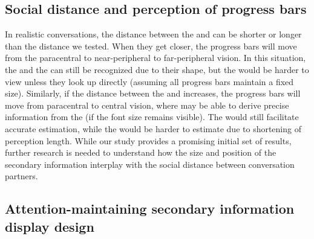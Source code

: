 \subsection{Social distance and perception of progress bars}

In realistic conversations, the distance between the \receiver{} and \observer{} can be shorter or longer than the distance we tested. When they get closer, the progress bars will move from the paracentral to near-peripheral to far-peripheral vision. In this situation, the \circularbar{} and the \linearbar{} can still be recognized due to their shape, but the \textbar{} would be harder to view unless they look up directly (assuming all progress bars maintain a fixed size). Similarly, if the distance between the \receiver{} and \observer{} increases, the progress bars will move from paracentral to central vision, where  may be able to derive precise information from the \textbar{} (if the font size remains visible). The \circularbar{} would still facilitate accurate estimation, while the \linearbar{} would be harder to estimate due to shortening of perception length. While our study provides a promising initial set of results, further research is needed to understand how the size and position of the secondary information interplay with the social distance between conversation partners.

\subsection{Attention-maintaining secondary information display design}

